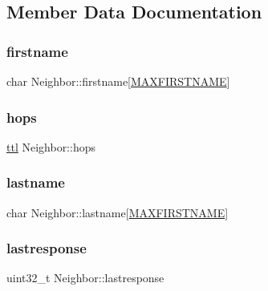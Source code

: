 \subsection{Member Data Documentation}
\mbox{\label{struct_neighbor_a5a5a3eaf67b27d5db06a3ce56af1082d}} 
\subsubsection{\texorpdfstring{firstname}{firstname}}
{\footnotesize\ttfamily char Neighbor\+::firstname\mbox{[}\hyperlink{haha_utils_8h_ac3dd1c10edba39fc5737be5b96a91d2a}{M\+A\+X\+F\+I\+R\+S\+T\+N\+A\+ME}\mbox{]}}

\mbox{\label{struct_neighbor_a1b3e73523c604b66fb9674dcf1ffade7}} 
\subsubsection{\texorpdfstring{hops}{hops}}
{\footnotesize\ttfamily \hyperlink{haha_utils_8h_a22ca626eb8f0deb847d1fae89476e26d}{ttl} Neighbor\+::hops}

\mbox{\label{struct_neighbor_ab58656971c71c0fc0cc4610e16f92a47}} 
\subsubsection{\texorpdfstring{lastname}{lastname}}
{\footnotesize\ttfamily char Neighbor\+::lastname\mbox{[}\hyperlink{haha_utils_8h_ac3dd1c10edba39fc5737be5b96a91d2a}{M\+A\+X\+F\+I\+R\+S\+T\+N\+A\+ME}\mbox{]}}

\mbox{\label{struct_neighbor_a78cd1ddbf02168247647691ccea29602}} 
\subsubsection{\texorpdfstring{lastresponse}{lastresponse}}
{\footnotesize\ttfamily uint32\+\_\+t Neighbor\+::lastresponse}

